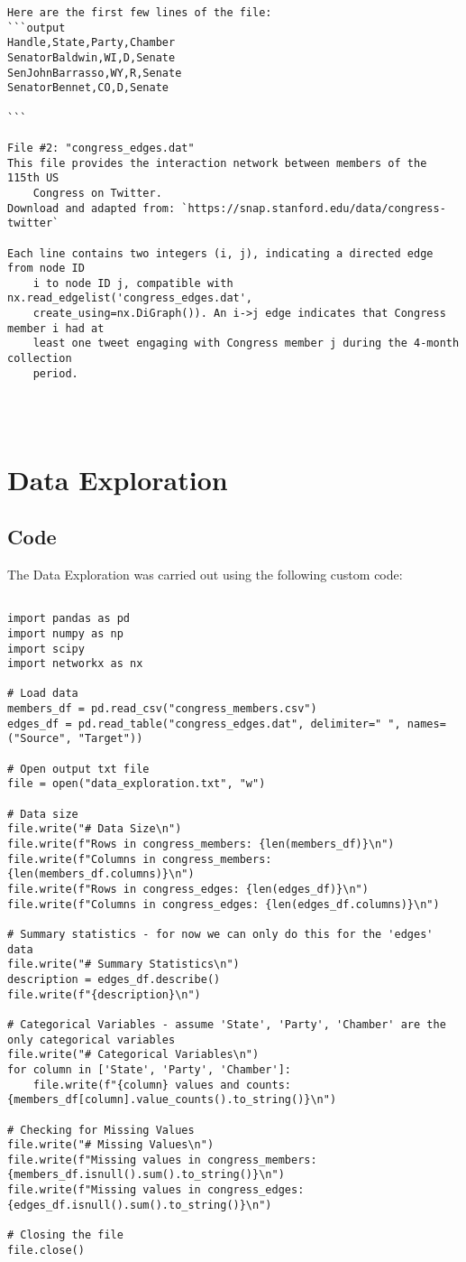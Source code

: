 \documentclass[11pt]{article}
\begin{document}
\begin{Verbatim}[tabsize=4]
Here are the first few lines of the file:
```output
Handle,State,Party,Chamber
SenatorBaldwin,WI,D,Senate
SenJohnBarrasso,WY,R,Senate
SenatorBennet,CO,D,Senate

```

File #2: "congress_edges.dat"
This file provides the interaction network between members of the 115th US
	Congress on Twitter.
Download and adapted from: `https://snap.stanford.edu/data/congress-twitter`

Each line contains two integers (i, j), indicating a directed edge from node ID
	i to node ID j, compatible with nx.read_edgelist('congress_edges.dat',
	create_using=nx.DiGraph()). An i->j edge indicates that Congress member i had at
	least one tweet engaging with Congress member j during the 4-month collection
	period.




\end{Verbatim}

\section{Data Exploration}
\subsection{{Code}}
The Data Exploration was carried out using the following custom code:

\begin{verbatim}

import pandas as pd
import numpy as np
import scipy
import networkx as nx

# Load data
members_df = pd.read_csv("congress_members.csv")
edges_df = pd.read_table("congress_edges.dat", delimiter=" ", names=("Source", "Target"))

# Open output txt file
file = open("data_exploration.txt", "w")

# Data size
file.write("# Data Size\n")
file.write(f"Rows in congress_members: {len(members_df)}\n")
file.write(f"Columns in congress_members: {len(members_df.columns)}\n")
file.write(f"Rows in congress_edges: {len(edges_df)}\n")
file.write(f"Columns in congress_edges: {len(edges_df.columns)}\n")

# Summary statistics - for now we can only do this for the 'edges' data
file.write("# Summary Statistics\n")
description = edges_df.describe()
file.write(f"{description}\n")

# Categorical Variables - assume 'State', 'Party', 'Chamber' are the only categorical variables
file.write("# Categorical Variables\n")
for column in ['State', 'Party', 'Chamber']:
    file.write(f"{column} values and counts: {members_df[column].value_counts().to_string()}\n")

# Checking for Missing Values
file.write("# Missing Values\n")
file.write(f"Missing values in congress_members: {members_df.isnull().sum().to_string()}\n")
file.write(f"Missing values in congress_edges: {edges_df.isnull().sum().to_string()}\n")

# Closing the file
file.close()

\end{verbatim}
\end{document}
